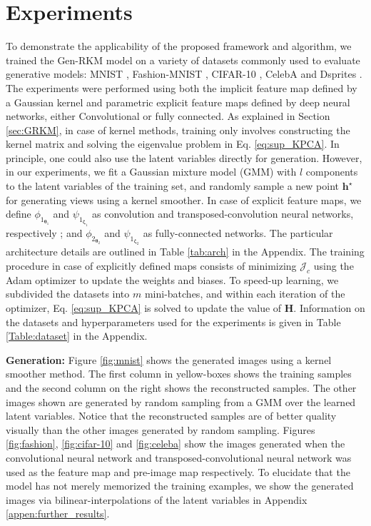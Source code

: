 \documentclass[preview,border=0.3pt]{standalone}
\begin{document}
%
%
\section{Experiments \label{sec:exp}}
%
To demonstrate the applicability of the proposed framework and algorithm, we trained the Gen-RKM model on a variety of datasets commonly used to evaluate generative models: MNIST \cite{lecun-mnisthandwrittendigit-2010}, Fashion-MNIST \cite{xiao2017/online}, CIFAR-10 \cite{cifar_10}, CelebA \cite{liu2015faceattributes} and Dsprites \cite{dsprites17}.
%
The experiments were performed using both the implicit feature map defined by a Gaussian kernel and parametric explicit feature maps defined by deep neural networks, either Convolutional or fully connected. As explained in Section \ref{sec:GRKM}, in case of kernel methods, training only involves constructing the kernel matrix and solving the eigenvalue problem in Eq. \ref{eq:sup_KPCA}. In principle, one could also use the latent variables directly for generation. However, in our experiments, we fit a Gaussian mixture model (GMM) with $l$ components to the latent variables of the training set, and randomly sample a new point $\bm{h}^{\star}$ for generating views using a kernel smoother. In case of explicit feature maps, we define $\phi_{1_{\bm{\theta}_1}}$ and $\psi_{1_{\bm{\zeta}_1}}$ as convolution and transposed-convolution neural networks, respectively \cite{dumoulin2016guide}; and $\phi_{2_{\bm{\theta}_2}}$ and $\psi_{1_{\bm{\zeta}_2}}$ as fully-connected networks. The particular architecture details are outlined in Table \ref{tab:arch} in the Appendix. The training procedure in case of explicitly defined maps consists of minimizing $\mathcal{J}_{c}$ using the Adam optimizer \cite{Adam} to update the weights and biases. To speed-up learning, we subdivided the datasets into $m$ mini-batches, and within each iteration of the optimizer, Eq. \ref{eq:sup_KPCA} is solved to update the value of $\bm{H}$. Information on the datasets and hyperparameters used for the experiments is given in Table \ref{Table:dataset} in the Appendix.
%
%

\noindent \textbf{Generation:}
Figure \ref{fig:mnist} shows the generated images using a kernel smoother method. The first column in yellow-boxes shows the training samples and the second column on the right shows the reconstructed samples. The other images shown are generated by random sampling from a GMM over the learned latent variables. Notice that the reconstructed samples are of better quality visually than the other images generated by random sampling. Figures \ref{fig:fashion}, \ref{fig:cifar-10} and \ref{fig:celeba} show the images generated when the convolutional neural network  and transposed-convolutional neural network was used as the feature map and pre-image map respectively. To elucidate that the model has not merely memorized the training examples, we show the generated images via bilinear-interpolations of the latent variables in Appendix \ref{appen:further_results}.
%
%
\end{document}
